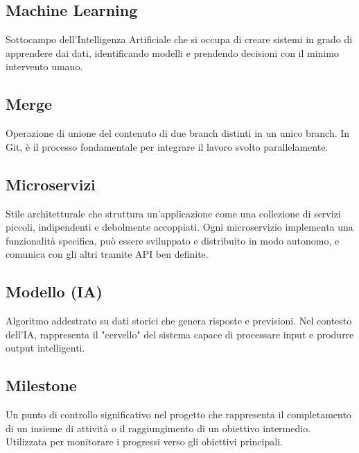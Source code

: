 \documentclass[a4paper, 11pt, oneside]{scrartcl} %
\begin{document}

\subsection*{Machine Learning}
Sottocampo dell'Intelligenza Artificiale che si occupa di creare sistemi in grado di apprendere dai dati, identificando modelli e prendendo decisioni con il minimo intervento umano.
\vspace{0.5cm}

\subsection*{Merge}
Operazione di unione del contenuto di due branch distinti in un unico branch. In Git, è il processo fondamentale per integrare il lavoro svolto parallelamente.
\vspace{0.5cm}

\subsection*{Microservizi}
Stile architetturale che struttura un'applicazione come una collezione di servizi piccoli, indipendenti e debolmente accoppiati. Ogni microservizio implementa una funzionalità specifica, può essere sviluppato e distribuito in modo autonomo, e comunica con gli altri tramite API ben definite.
\vspace{0.5cm}

\subsection*{Modello (IA)}


Algoritmo addestrato su dati storici che genera risposte e previsioni. Nel contesto dell'IA, rappresenta il "cervello" del sistema capace di processare input e produrre output intelligenti.

\vspace{0.5cm}

\subsection*{Milestone}
Un punto di controllo significativo nel progetto che rappresenta il completamento di un insieme di attività o il raggiungimento di un obiettivo intermedio. Utilizzata per monitorare i progressi verso gli obiettivi principali.
\vspace{0.5cm}
\end{document}
